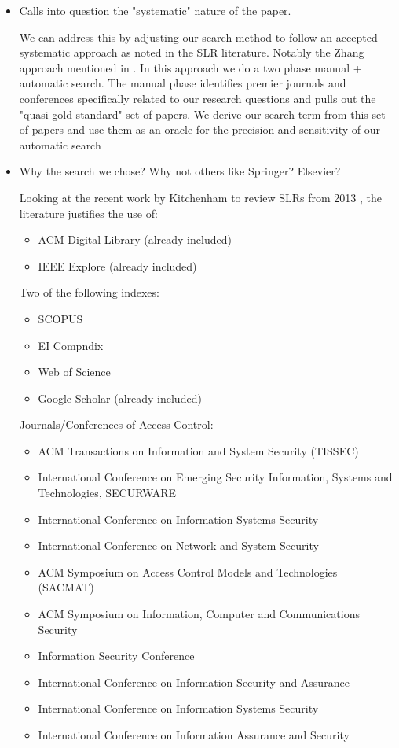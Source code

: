 \begin{itemize}

\item Calls into question the "systematic" nature of the paper.

We can address this by adjusting our search method to follow an accepted systematic approach as noted in the SLR literature. Notably the Zhang \cite{zhang2011identifying} approach mentioned in \cite{kitchenham2013systematic}. 
In this approach we do a two phase manual + automatic search. 
The manual phase identifies premier journals and conferences specifically related to our research questions and pulls out the "quasi-gold standard" set of papers.
We derive our search term from this set of papers and use them as an oracle for the precision and sensitivity of our automatic search

\item Why the search we chose? Why not others like Springer? Elsevier?

Looking at the recent work by Kitchenham to review SLRs from 2013 \cite{kitchenham2013systematic}, the literature justifies the use of: 

  \begin{itemize}
    \item ACM Digital Library (already included)
    \item IEEE Explore (already included)
  \end{itemize}

Two of the following indexes:
  \begin{itemize}
    \item SCOPUS
    \item EI Compndix
    \item Web of Science
    \item Google Scholar (already included)
  \end{itemize}

Journals/Conferences of Access Control:

  \begin{itemize}
    \item ACM Transactions on Information and System Security (TISSEC)
    \item International Conference on Emerging Security Information, Systems and Technologies, SECURWARE
    \item International Conference on Information Systems Security
    \item International Conference on Network and System Security
    \item ACM Symposium on Access Control Models and Technologies (SACMAT)
    \item ACM Symposium on Information, Computer and Communications Security
    \item Information Security Conference
    \item International Conference on Information Security and Assurance
    \item International Conference on Information Systems Security
    \item International Conference on Information Assurance and Security
  \end{itemize}


\end{itemize}
